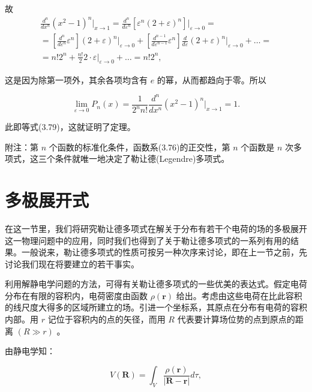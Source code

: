 故
\begin{equation*}
\begin{array}{l}\frac {d ^ {n}}{d x ^ {n}} (x ^ {2} - 1) ^ {n} \Big | _ {x \rightarrow 1} = \frac {d ^ {n}}{d \varepsilon^ {n}} [ \varepsilon^ {n} (2 + \varepsilon) ^ {n} ] \Big | _ {\varepsilon \rightarrow 0} =\\= \left[ \frac {d ^ {n}}{d \varepsilon^ {n}} \varepsilon^ {n} \right] (2 + \varepsilon) ^ {n} \Big | _ {\varepsilon \rightarrow 0} + \left[ \frac {d ^ {n - 1}}{d \varepsilon^ {n - 1}} \varepsilon^ {n} \right] \frac {d}{d \varepsilon} (2 + \varepsilon) ^ {n} \Big | _ {\varepsilon \rightarrow 0} + \dots =\\= n! 2 ^ {n} + \frac {n !}{2} 2 \cdot \varepsilon \Big | _ {\varepsilon \rightarrow 0} + \dots = n! 2 ^ {n},\end{array}
\end{equation*}

这是因为除第一项外，其余各项均含有 $e$ 的幂，从而都趋向于零。所以

\begin{equation*}
\lim _ {\varepsilon \rightarrow 0} P _ {n} (x) = \frac {1}{2 ^ {n} n !} \frac {d ^ {n}}{d x ^ {n}} \left(x ^ {2} - 1\right) ^ {n} \Bigg | _ {x \rightarrow 1} = 1.
\end{equation*}

此即等式(3.79)，这就证明了定理。

附注：第 $n$ 个函数的标准化条件，函数系(3.76)的正交性，第 $n$ 个函数是 $n$ 次多项式，这三个条件就唯一地决定了勒让德(Legendre)多项式。

\section{多极展开式}

在这一节里，我们将研究勒让德多项式在解关于分布有若干个电荷的场的多极展开这一物理问题中的应用，同时我们也得到了关于勒让德多项式的一系列有用的结果。一般说来，勒让德多项式的性质可按另一种次序来讨论，即在上一节之前，先讨论我们现在将要建立的若干事实。

利用解静电学问题的方法，可得有关勒让德多项式的一些优美的表达式。假定电荷分布在有限的容积内，电荷密度由函数 $\rho(\boldsymbol{r})$ 给出。考虑由这些电荷在比此容积的线尺度大得多的区域所建立的场。引进一个坐标系，其原点在分布有电荷的容积内部。用 $r$ 记位于容积内的点的矢径，而用 $R$ 代表要计算场位势的点到原点的距离 $(R \gg r)$ 。

由静电学知：

\begin{equation*}
V (\boldsymbol {R}) = \int_ {V} \frac {\rho (\boldsymbol {r})}{| \boldsymbol {R} - \boldsymbol {r} |} d \tau ,
\end{equation*}

